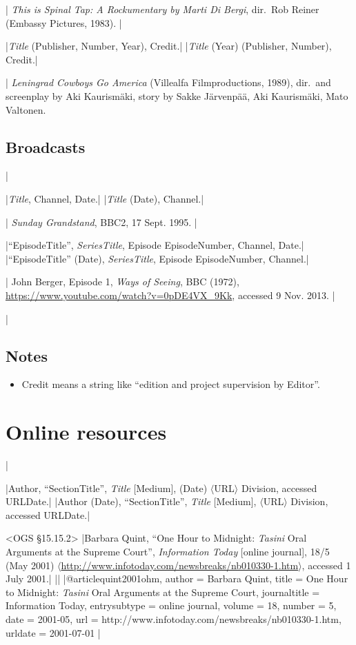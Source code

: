 \documentclass[extrafontsizes,11pt,a4paper,oneside]{memoir}
\newcommand*{\lit}[1]{\textsf{#1}}
\begin{document}
\todoc|
\emph{This is Spinal Tap: A Rockumentary by Marti Di Bergi}, dir.\ Rob Reiner (Embassy Pictures, 1983).
|

\specs
|\emph{Title} (Publisher, Number, Year), Credit.|%
|\emph{Title} (Year) (Publisher, Number), Credit.|

\todoc|
\emph{Leningrad Cowboys Go America} (Villealfa Filmproductions, 1989), dir.\ and screenplay by Aki Kaurismäki, story by Sakke Järvenpää, Aki Kaurismäki, Mato Valtonen.

\section{Broadcasts}
|

\specs
|\emph{Title}, Channel, Date.|%
|\emph{Title} (Date), Channel.|

\todoc|
\emph{Sunday Grandstand}, BBC2, 17 Sept. 1995.
|

\specs
|\enquote{EpisodeTitle}, \emph{SeriesTitle}, \lit{Episode} EpisodeNumber, Channel, Date.|%
|\enquote{EpisodeTitle} (Date), \emph{SeriesTitle}, \lit{Episode} EpisodeNumber, Channel.|

\todoc|
John Berger, Episode 1, \emph{Ways of Seeing}, BBC (1972), \url{https://www.youtube.com/watch?v=0pDE4VX_9Kk}, accessed 9 Nov. 2013.
|

\todoc|
\section{Notes}

\begin{itemize}
  \item Credit means a string like \enquote{edition and project supervision by Editor}.
\end{itemize}

\chapter{Online resources}\label{sec:electronic}
|

\specs
|Author, \enquote{SectionTitle}, \emph{Title} [Medium], (Date) $\langle$URL$\rangle$ Division, \lit{accessed} URLDate.|%
|Author (Date), \enquote{SectionTitle}, \emph{Title} [Medium], $\langle$URL$\rangle$ Division, \lit{accessed} URLDate.|

\bibexample<OGS \S15.15.2>
|Barbara Quint, \enquote{One Hour to Midnight: \emph{Tasini} Oral Arguments at the Supreme Court}, \emph{Information Today} [online journal], 18/5 (May 2001) $\langle$\url{http://www.infotoday.com/newsbreaks/nb010330-1.htm}$\rangle$, accessed 1 July 2001.|%
||%
|@article{quint2001ohm,
  author = {Barbara Quint},
  title = {One Hour to Midnight: \emph{Tasini} Oral Arguments at the Supreme Court},
  journaltitle = {Information Today},
  entrysubtype = {online journal},
  volume = {18},
  number = {5},
  date = {2001-05},
  url = {http://www.infotoday.com/newsbreaks/nb010330-1.htm},
  urldate = {2001-07-01}
}|
\end{document}
